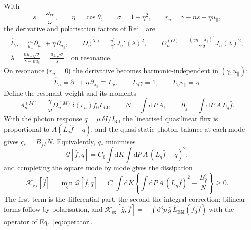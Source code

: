 \documentclass[11pt,a4paper]{article}
\numberwithin{equation}{section}
\newcommand{\dd}{\mathrm{d}}
\newcommand{\upar}{u_\parallel}
\newcommand{\uperp}{u_\perp}
\newcommand{\fh}{\hat f}
\newcommand{\Kex}{\mathcal K_{\mathrm{ex}}}
\begin{document}
With
\begin{equation}
s=\frac{\omega_{ce}}{\omega},\qquad \eta=\cos\theta,\qquad \sigma=1-\eta^2,\qquad
r_n=\gamma-ns-\eta\upar,
\end{equation}
the derivative and polarisation factors of Ref.~\cite{KK96} are
\begin{gather}
\hat L_n=\frac{ns}{\uperp}\partial_{\uperp}+\eta\,\partial_{\upar},\qquad
D_n^{(X)}=\frac{\uperp^2}{\gamma^2}J_n'(\lambda)^2,\qquad
D_n^{(O)}=\frac{(\gamma\eta-\upar)^2}{\gamma^2\sigma}J_n(\lambda)^2,\\
\lambda=\frac{n\uperp\sqrt\sigma}{\gamma-\eta\upar}=\frac{\uperp\sqrt\sigma}{s}
\quad\text{on resonance.}
\end{gather}
On resonance ($r_n=0$) the derivative becomes harmonic-independent in
$(\gamma,\upar)$:
\begin{equation}
\hat L_n=\partial_\gamma+\eta\,\partial_{\upar}\equiv L_\eta,\qquad L_\eta\gamma=1,\qquad L_\eta\upar=\eta .
\label{eq:Leta}
\end{equation}
Define the resonant weight and its moments
\begin{equation}
A_n^{(M)}=\frac{\gamma}{\omega}D_n^{(M)}\delta(r_n)f_0I_{\mathrm{RJ}},\qquad
N=\int\dd P\,A,\qquad B_{\fh}=\int\dd P\,A\,L_\eta\fh .
\end{equation}
With the photon response $q=\mu\,\delta I/I_{\mathrm{RJ}}$ the linearised
quasilinear flux is proportional to $A(L_\eta\fh-q)$, and the quasi-static photon
balance at each mode gives $q_*=B_{\fh}/N$. Equivalently, $q_*$ minimises
\begin{equation}
\mathcal Q[\fh,q]=C_0\int\dd K\int\dd P\,A\,(L_\eta\fh-q)^2 ,
\label{eq:Q}
\end{equation}
and completing the square mode by mode gives the dissipation
\begin{equation}
\Kex[\fh]=\min_q\mathcal Q[\fh,q]
=C_0\int\dd K\left\{\int\dd P\,A\,(L_\eta\fh)^2-\frac{B_{\fh}^2}{N}\right\}\ge0 .
\label{eq:Kex}
\end{equation}
The first term is the differential part, the second the integral correction;
bilinear forms follow by polarisation, and
$\Kex[\hat g,\fh]=-\int\dd^3p\,\hat g\,\hat L_{\mathrm{EM}}(f_0\fh)$ with the
operator of Eq.~\eqref{eq:operator}.
\end{document}
